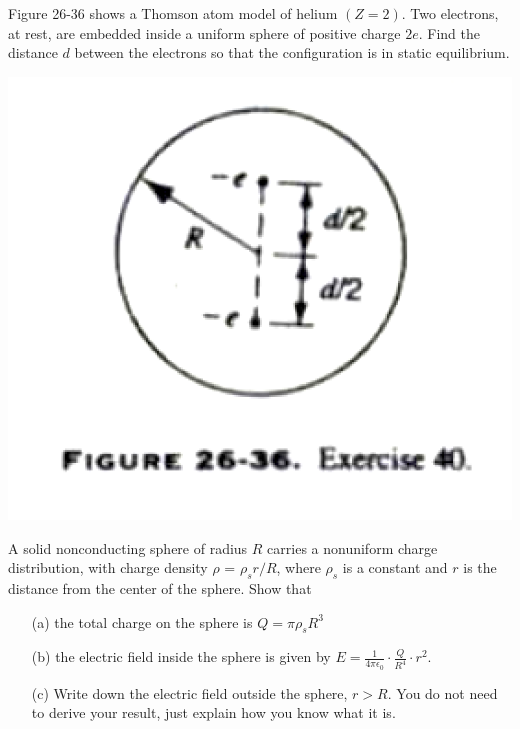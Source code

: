 \documentclass[11pt,letterpaper,boxed]{hmcpset}
\begin{document}
	\begin{solution}
		\vfill
	\end{solution}
	\newpage	
	
	\begin{problem}[HRK E26.40]
		Figure 26-36 shows a Thomson atom model of helium $(Z = 2)$. Two electrons, at rest, are embedded inside a uniform sphere of positive charge $2e$. Find the distance $d$ between the electrons so that the configuration is in static equilibrium.
		
		\begin{center}
			\includegraphics[scale=0.55]{26-36.png}
		\end{center}
		
	\end{problem}
	
	\begin{solution}
		\vfill
	\end{solution}
	\newpage
	
	\begin{problem}[HRK P27.17]
		A solid nonconducting sphere of radius $R$ carries a nonuniform charge distribution, with charge density $\rho$ = $\rho_s r/R$, where $\rho_s$ is a constant and $r$ is the distance from the center of the sphere. Show that
		\begin{enumerate}
			\item[(a)]the total charge on the sphere is $Q = \pi\rho_s R^3$
			\item[(b)]the electric field inside the sphere is given by $E = \frac{1}{4\pi\epsilon_0}\cdot\frac{Q}{R^4} \cdot r^2$.
			\item[(c)]Write down the electric field outside the sphere, $r > R$. You do not need to derive your result, just explain how you know what it is.
		\end{enumerate}
		
		
	\end{problem}
	
\end{document}
